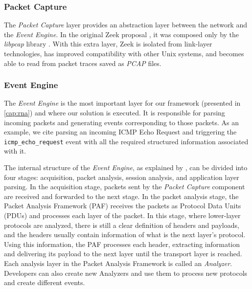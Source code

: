 \subsubsection*{Packet Capture}

The \textit{Packet Capture} layer provides an abstraction layer between the network and the \textit{Event Engine}. In the original Zeek proposal \cite{Paxson1999}, it was composed only by the \textit{libpcap} library \cite{Libpcap}. With this extra layer, Zeek is isolated from link-layer technologies, has improved compatibility with other Unix systems, and becomes able to read from packet traces saved as \textit{PCAP} files.

\subsubsection*{Event Engine}
\label{sec:bg:zeek_ee}

The \textit{Event Engine} is the most important layer for our framework (presented in \autoref{cap:rna}) and where our solution is executed. It is responsible for parsing incoming packets and generating events corresponding to those packets. As an example, we cite parsing an incoming ICMP Echo Request and triggering the \texttt{icmp\_echo\_request} event with all the required structured information associated with it.

The internal structure of the \textit{Event Engine}, as explained by , can be divided into four stages: acquisition, packet analysis, session analysis, and application layer parsing. In the acquisition stage, packets sent by the \textit{Packet Capture} component are received and forwarded to the next stage. In the packet analysis stage, the Packet Analysis Framework (PAF) receives the packets as Protocol Data Units (PDUs) and processes each layer of the packet. In this stage, where lower-layer protocols are analyzed, there is still a clear definition of headers and payloads, and the headers usually contain information of what is the next layer's protocol. Using this information, the PAF processes each header, extracting information and delivering its payload to the next layer until the transport layer is reached. Each analysis layer in the Packet Analysis Framework is called an \textit{Analyzer}. Developers can also create new Analyzers and use them to process new protocols and create different events.


